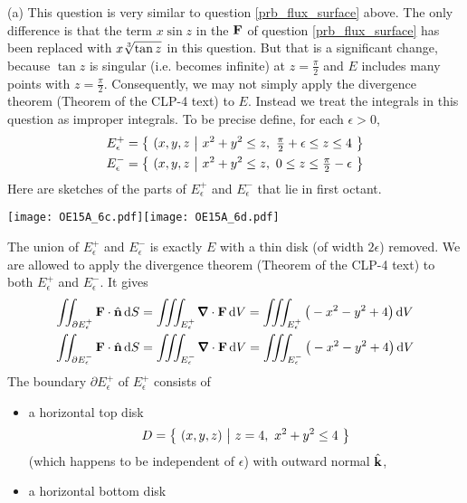 \begin{solution} (a) This question is very similar to question \ref{prb_flux_surface} above. 
The only difference is that the term $x\sin z$ in the $\mathbf{F}$ of question \ref{prb_flux_surface}
has been replaced with $x\root{3}\of{\tan z}$ in this question. But that is a significant 
change, because $\tan z$ is singular (i.e. becomes infinite) at $z=\tfrac{\pi}{2}$
and $E$ includes many points with $z=\tfrac{\pi}{2}$. Consequently, we may not
simply apply the divergence theorem (Theorem  of the 
CLP-4 text) to $E$. Instead we treat the integrals in this question as improper 
integrals. To be precise define, for each $\epsilon>0$,
\begin{align*}
E_\epsilon^+ &= \Set{(x,y,z}{x^2+y^2\le z,\ \tfrac{\pi}{2}+\epsilon\le z\le 4} \\
E_\epsilon^- &= \Set{(x,y,z}{x^2+y^2\le z,\ 0\le z \le \tfrac{\pi}{2}-\epsilon} 
\end{align*} 
Here are sketches of the parts of $E_\epsilon^+$ and $E_\epsilon^-$ that lie in first octant.
 \begin{center}
    \texttt{[image: OE15A\_6c.pdf]}\quad \texttt{[image: OE15A\_6d.pdf]}
\end{center}
The union of $E_\epsilon^+$ and $E_\epsilon^-$ is exactly $E$ with a thin disk
(of width $2\epsilon$) removed. We are allowed to apply the  divergence theorem 
(Theorem  of the CLP-4 text) to both $E_\epsilon^+$ and $E_\epsilon^-$.
It gives  
\begin{align*}
\dblInt_{\partial E_\epsilon^+}\vF\cdot\hn\,\dee{S}
&=\tripInt_{E_\epsilon^+} \vnabla\cdot\vF\,\dee{V} 
 =\tripInt_{E_\epsilon^+} \big(-x^2-y^2+4\big)\,\dee{V} \\
\dblInt_{\partial E_\epsilon^-}\vF\cdot\hn\,\dee{S}
&=\tripInt_{E_\epsilon^-} \vnabla\cdot\vF\,\dee{V} 
 =\tripInt_{E_\epsilon^-} \big(-x^2-y^2+4\big)\,\dee{V} 
\end{align*}
The boundary $\partial E_\epsilon^+$ of $E_\epsilon^+$ consists of
\begin{itemize}\itemsep1pt \parskip0pt  %
\item a horizontal top disk 
\begin{equation*}
   D =\big\{ \ (x,y,z)\ \big|\ z=4,\ x^2+y^2\le 4\ \big\}
\end{equation*}
(which happens to be independent of $\epsilon$) with outward normal $\hat{\mathbf{k}}$,
\item a horizontal bottom disk
\begin{equation*}

\end{equation*}
\end{itemize}
\end{solution}
